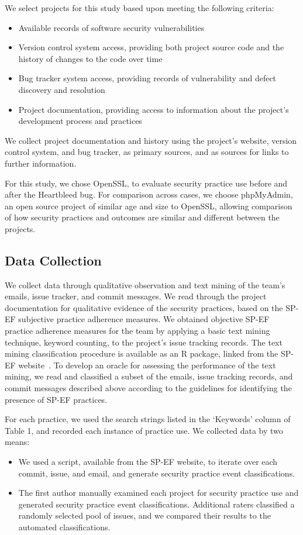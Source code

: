 We select projects for this study based upon meeting the following criteria:
\begin{itemize}

\item Available records of software security vulnerabilities
\item Version control system access, providing both project source code and the history of changes to the code over time
\item Bug tracker system access, providing records of vulnerability and defect discovery and resolution
\item Project documentation, providing access to information about the project’s development process and practices
\end{itemize}

We collect project documentation and history using the project’s website, version control system, and bug tracker, as primary sources, and as sources for links to further information. 

For this study, we chose OpenSSL, to evaluate security practice use before and after the Heartbleed bug.  For comparison across cases, we choose phpMyAdmin, an open source project of similar age and size to OpenSSL, allowing comparison of how security practices and outcomes are similar and different between the projects. 

\subsection{Data Collection}

We collect data through qualitative observation and text mining of the team's emails, issue tracker, and commit messages. We read through the project documentation for qualitative evidence of the security practices, based on the SP-EF subjective practice adherence measures. We obtained objective SP-EF practice adherence measures for the team by applying a basic text mining technique, keyword counting, to the project's issue tracking records. The text mining classification procedure is available as an R package, linked from the SP-EF website~\cite{morrison2016spef}.   To develop an oracle for assessing the performance of the text mining, we read and classified a subset of the emails, issue tracking records, and commit messages described above according to the guidelines for identifying the presence of SP-EF practices. 

For each practice, we used the search strings listed in the ‘Keywords’ column of Table 1, and recorded each instance of practice use.  We collected data by two means:
\begin{itemize}
\item We used a script, available from the SP-EF website, to iterate over each commit, issue, and email, and generate security practice event classifications.
\item The first author manually examined each project for security practice use and generated security practice event classifications. Additional raters classified a randomly selected pool of issues, and we compared their results to the automated classifications.
\end{itemize}


